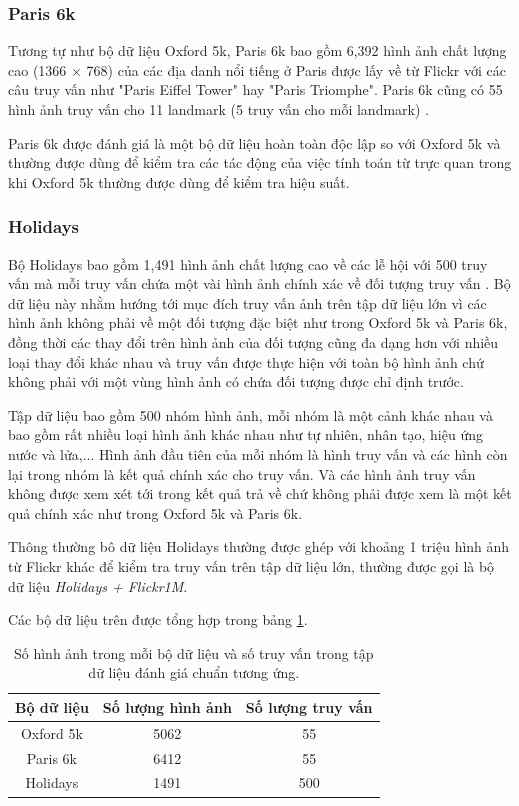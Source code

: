 \subsubsection{Paris 6k}
Tương tự như bộ dữ liệu Oxford 5k, Paris 6k bao gồm 6,392 hình ảnh chất lượng cao (1366 $\times$ 768) của các địa danh nổi tiếng ở Paris được lấy về từ Flickr với các câu truy vấn như "Paris Eiffel Tower" hay "Paris Triomphe". Paris 6k cũng có 55 hình ảnh truy vấn cho 11 landmark (5 truy vấn cho mỗi landmark) \cite{philbin2008lost}.

Paris 6k được đánh giá là một bộ dữ liệu hoàn toàn độc lập so với Oxford 5k và thường được dùng để kiểm tra các tác động của việc tính toán từ trực quan trong khi Oxford 5k thường được dùng để kiểm tra hiệu suất.

\subsubsection{Holidays}
Bộ Holidays bao gồm 1,491 hình ảnh chất lượng cao về các lễ hội với 500 truy vấn mà mỗi truy vấn chứa một vài hình ảnh chính xác về đối tượng truy vấn \cite{JDS08}. Bộ dữ liệu này nhằm hướng tới mục đích truy vấn ảnh trên tập dữ liệu lớn vì các hình ảnh không phải về một đối tượng đặc biệt như trong Oxford 5k và Paris 6k, đồng thời các thay đổi trên hình ảnh của đối tượng cũng đa dạng hơn với nhiều loại thay đổi khác nhau và truy vấn được thực hiện với toàn bộ hình ảnh chứ không phải với một vùng hình ảnh có chứa đối tượng được chỉ định trước.

Tập dữ liệu bao gồm 500 nhóm hình ảnh, mỗi nhóm là một cảnh khác nhau và bao gồm rất nhiều loại hình ảnh khác nhau như tự nhiên, nhân tạo, hiệu ứng nước và lửa,... Hình ảnh đầu tiên của mỗi nhóm là hình truy vấn và các hình còn lại trong nhóm là kết quả chính xác cho truy vấn. Và các hình ảnh truy vấn không được xem xét tới trong kết quả trả về chứ không phải được xem là một kết quả chính xác như trong Oxford 5k và Paris 6k.

Thông thường bô dữ liệu Holidays thường được ghép với khoảng 1 triệu hình ảnh từ Flickr khác để kiểm tra truy vấn trên tập dữ liệu lớn, thường được gọi là bộ dữ liệu \textit{Holidays + Flickr1M}.

Các bộ dữ liệu trên được tổng hợp trong bảng \ref{table:dataset}.
\begin{table}
\begin{center}
	\begin{tabular}{c c c}
	\hline
	Bộ dữ liệu & Số lượng hình ảnh & Số lượng truy vấn \\ \hline
    Oxford 5k & 5062 & 55 \\ 
    Paris 6k & 6412 & 55 \\
    Holidays & 1491 & 500 \\
	\hline
	\end{tabular}
\end{center}
\caption[Số hình ảnh trong mỗi bộ dữ liệu và số truy vấn trong tập dữ liệu đánh giá chuẩn tương ứng]{Số hình ảnh trong mỗi bộ dữ liệu và số truy vấn trong tập dữ liệu đánh giá chuẩn tương ứng.}
\label{table:dataset}
\end{table}

